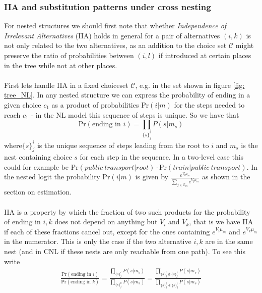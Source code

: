 \subsubsection{IIA and substitution patterns under cross nesting} \label{sec: iiaproof}
For nested structures we should first note that whether \textit{Independence of Irrelevant Alternatives} (IIA) holds in general for a pair of alternatives $(i,k)$ is not only related to the two alternatives, as an addition to the choice set $\mathcal{C}$ might preserve the ratio of probabilities between $(i,l)$ if introduced at certain places in the tree while not at other places.
\\ \\
First lets handle IIA in a fixed choiceset $\mathcal{C}$, e.g. in the set shown in figure \ref{fig: tree_NL}. In any nested structure we can express the probability of ending in a given choice $c_1$ as a product of probabilities $\textrm{Pr}(i|m)$ for the steps needed to reach $c_1$ - in the NL model this sequence of steps is unique. So we have that
\begin{equation}
  \textrm{Pr}(\textrm{ending in }i) = \prod_{\{s\}_{j}^{i}} P(s|m_s)
\end{equation}
where$\{s\}_{j}^{i}$ is the unique sequence of steps leading from the root to $i$ and $m_s$ is the nest containing choice $s$ for each step in the sequence. In a two-level case this could for example be $\textrm{Pr}(public \ transport| root)\cdot \textrm{Pr}(train | public \ transport)$.
In the nested logit the probability $\textrm{Pr}(i|m)$ is given by $\frac{e^{V_i \mu_m}} {\sum_{j \in  \mathcal{C}_m} e^{V_j \mu_m}}$ as shown in the section on estimation.
\\ \\
IIA is a property by which the fraction of two such products for the probability of ending in $i,k$ does not depend on anything but $V_i$ and $V_k$, that is we have IIA if each of these fractions cancel out, except for the ones containing $e^{V_i\mu_m}$ and $e^{V_k\mu_m}$ in the numerator. This is only the case if the two alternative $i,k$ are in the same nest (and in CNL if these nests are only reachable from one path). To see this write
\begin{equation}
  \begin{split}
  \frac{\textrm{Pr}(\textrm{ending in }i)}{\textrm{Pr}(\textrm{ending in }k)} =
  \frac{\prod_{\{s\}_{j}^{i}} P(s|m_s)}{\prod_{\{s\}_{j}^{k}} P(s|m_s)}
  =
  \frac{\prod_{\{s\}_{j}^{i} \not\in \{s\}_{j}^{k}} P(s|m_s)}{\prod_{\{s\}_{j}^{k} \not\in \{s\}_{j}^{i}} P(s|m_s)}
  \end{split}
\end{equation}
